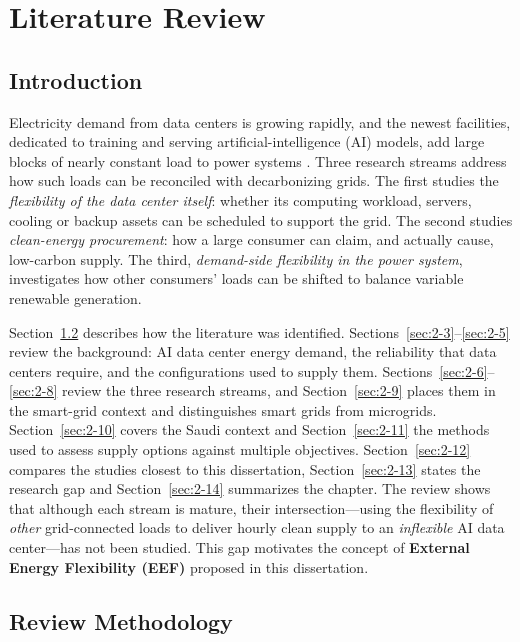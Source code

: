 \chapter{Literature Review}\label{ch:literature}

\section{Introduction}\label{sec:2-1}

Electricity demand from data centers is growing rapidly, and the newest facilities, dedicated to training and serving artificial-intelligence (AI) models, add large blocks of nearly constant load to power systems \cite{r1,r8,r24}. Three research streams address how such loads can be reconciled with decarbonizing grids. The first studies the \emph{flexibility of the data center itself}: whether its computing workload, servers, cooling or backup assets can be scheduled to support the grid. The second studies \emph{clean-energy procurement}: how a large consumer can claim, and actually cause, low-carbon supply. The third, \emph{demand-side flexibility in the power system}, investigates how other consumers' loads can be shifted to balance variable renewable generation.

Section~\ref{sec:2-2} describes how the literature was identified. Sections~\ref{sec:2-3}--\ref{sec:2-5} review the background: AI data center energy demand, the reliability that data centers require, and the configurations used to supply them. Sections~\ref{sec:2-6}--\ref{sec:2-8} review the three research streams, and Section~\ref{sec:2-9} places them in the smart-grid context and distinguishes smart grids from microgrids. Section~\ref{sec:2-10} covers the Saudi context and Section~\ref{sec:2-11} the methods used to assess supply options against multiple objectives. Section~\ref{sec:2-12} compares the studies closest to this dissertation, Section~\ref{sec:2-13} states the research gap and Section~\ref{sec:2-14} summarizes the chapter. The review shows that although each stream is mature, their intersection---using the flexibility of \emph{other} grid-connected loads to deliver hourly clean supply to an \emph{inflexible} AI data center---has not been studied. This gap motivates the concept of \textbf{External Energy Flexibility (EEF)} proposed in this dissertation.

\section{Review Methodology}\label{sec:2-2}

